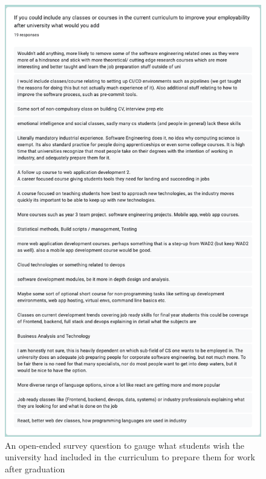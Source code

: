 \documentclass{l4proj}
\begin{document}
\begin{appendices}
\begin{figure}[!ht]
    \centering
    \includegraphics{dissertation/images/prog-survey-Q4.png}
    \caption{An open-ended survey question to gauge what students wish the university had included in the curriculum to prepare them for work after graduation}
    \label{fig:survey-q4}
\end{figure}

\label{appendix:studentunistudy}
\end{appendices}






\end{document}
